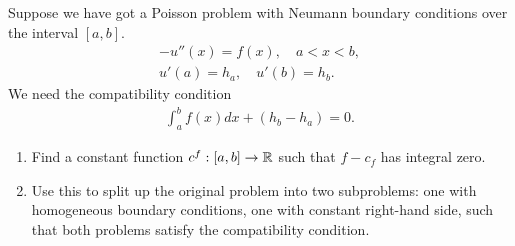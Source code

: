 \documentclass[11pt]{article}
\begin{document}
\begin{exercise}
    Suppose we have got a Poisson problem with Neumann boundary conditions over the interval $[a,b]$. 
    \begin{gather*}
        - u''(x) = f(x), \quad a < x < b,
        \\
        u'(a) = h_a, \quad u'(b) = h_b.
    \end{gather*}
    We need the compatibility condition 
    \begin{gather*}
        \int_a^b f(x) dx + ( h_b - h_a ) = 0.
    \end{gather*}
    \begin{enumerate}[label=(\alph*)]
        \item
        Find a constant function $c^f : [a,b] \to \mathbb{R}$ such that $f - c_f$ has integral zero.
        \item
        Use this to split up the original problem into two subproblems: 
        one with homogeneous boundary conditions, one with constant right-hand side, such that both problems satisfy the compatibility condition.
    \end{enumerate}
\end{exercise}
\begin{solution}     
\end{solution}
\end{document}
